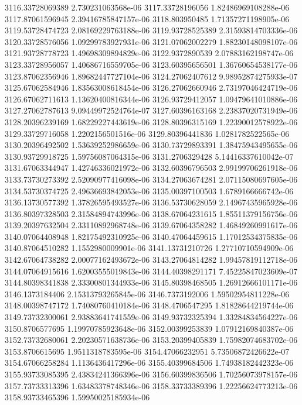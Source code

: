 {3116.33728069389 2.730231063568e-06
3117.33728196056 1.82486969108288e-06
3117.87061596945 2.39416785847157e-06
3118.803950485 1.71357271198905e-06
3119.53728474723 2.08169229763188e-06
3119.93728525389 2.31593814703336e-06
3120.33728576056 1.09299783927931e-06
3121.07062002279 1.88230148098107e-06
3121.93728778723 1.49698309894829e-06
3122.9372890539 2.07883162198747e-06
3123.33728956057 1.40686716559705e-06
3123.60395656501 1.36760654538177e-06
3123.87062356946 1.89682447727104e-06
3124.27062407612 9.98952874275933e-07
3125.67062584946 1.83563008618454e-06
3126.27062660946 2.73197046424719e-06
3126.67062711613 1.13620400816344e-06
3126.93729412057 1.09479641010886e-06
3127.27062787613 9.09449972524764e-07
3127.60396163168 2.23837020731949e-06
3128.20396239169 1.68229227443619e-06
3128.80396315169 1.22390012578922e-06
3129.33729716058 1.2202156501516e-06
3129.80396441836 1.0281782522565e-06
3130.20396492502 1.53639252986659e-06
3130.73729893391 1.38475943495655e-06
3130.93729918725 1.59756087064315e-06
3131.2706329428 5.14416337610042e-07
3131.67063344947 1.42746336021972e-06
3132.60396796503 2.99199706261918e-06
3133.73730273392 2.52090977416098e-06
3134.27063674281 2.07115080697605e-06
3134.53730374725 2.49636693842053e-06
3135.00397100503 1.6789166666742e-06
3136.13730577392 1.37826595493527e-06
3136.53730628059 2.14967435965928e-06
3136.80397328503 2.31584894743996e-06
3138.67064231615 1.85511379156756e-06
3139.20397632504 2.33110892968748e-06
3139.67064358282 1.46849260991617e-06
3140.07064408948 1.82175492310925e-06
3140.47064459615 1.17012534375835e-06
3140.87064510282 1.1552980009901e-06
3141.13731210726 1.27710710594909e-06
3142.67064738282 2.00077162493672e-06
3143.27064814282 1.99457819112718e-06
3144.07064915616 1.62003555019843e-06
3144.40398291171 7.45225847023609e-07
3144.80398341838 2.33300801344933e-06
3145.80398468505 1.26912666101171e-06
3146.1373184406 2.15313793265845e-06
3146.7373192006 1.59502954811228e-06
3148.00398747172 1.74080760410184e-06
3148.4706547295 1.81828644219744e-06
3149.73732300061 2.93883641741559e-06
3149.93732325394 1.33284834564227e-06
3150.8706577695 1.19970785923648e-06
3152.00399253839 1.07912169840387e-06
3152.73732680061 2.20230571638736e-06
3153.20399405839 1.75982074683702e-06
3153.8706615695 1.9511318783595e-06
3154.47066232951 5.73506872426622e-07
3154.67066258284 1.1136436417296e-06
3155.40399684506 1.74938182442323e-06
3155.93733085395 2.43834241366396e-06
3156.60399836506 1.70256073978157e-06
3157.73733313396 1.63483378748346e-06
3158.33733389396 1.22256624773213e-06
3158.93733465396 1.59950025185934e-06
}
